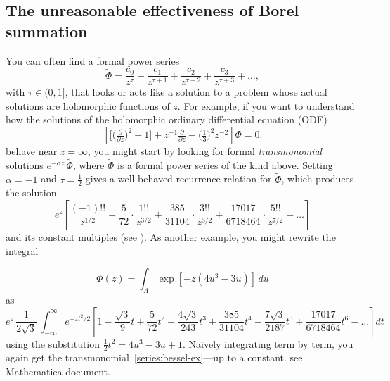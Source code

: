 \documentclass{article}
\newcommand{\series}[1]{\tilde{#1}}
\theoremstyle{definition}
\theoremstyle{plain}
\newenvironment{verify}{\color{ForestGreen}}{\color{black}}
\begin{document}
\subsection{The unreasonable effectiveness of Borel summation}\label{intro:summation}
You can often find a formal power series %
\[ \series{\Phi} = \frac{c_0}{z^\tau} + \frac{c_1}{z^{\tau+1}} + \frac{c_2}{z^{\tau+2}} + \frac{c_3}{z^{\tau+3}} + \ldots, \]
with $\tau \in (0, 1]$, that looks or acts like a solution to a problem whose actual solutions are holomorphic functions of $z$. For example, if you want to understand how the solutions of the holomorphic ordinary differential equation (ODE)
\begin{equation}
\left[ \big[ \big(\tfrac{\partial}{\partial z}\big)^2 - 1 \big] + z^{-1} \tfrac{\partial}{\partial z} - \big(\tfrac{1}{3}\big)^2 z^{-2} \right] \Phi= 0. \label{eqn:bessel-rescaled-1}
\end{equation}
behave near $z = \infty$, you might start by looking for formal {\em transmonomial} solutions $e^{-\alpha z}\,\series{\Phi}$, where $\series{\Phi}$ is a formal power series of the kind above. Setting $\alpha = -1$ and $\tau = \tfrac{1}{2}$ gives a well-behaved recurrence relation for $\series{\Phi}$, which produces the solution 
\begin{equation}
e^{z} \left[ \frac{(-1)!!}{z^{1/2}} + \frac{5}{72} \cdot \frac{1!!}{z^{3/2}} + \frac{385}{31104} \cdot \frac{3!!}{z^{5/2}} + \frac{17017}{6718464} \cdot \frac{5!!}{z^{7/2}} + \ldots \right] \label{series:bessel-ex}
\end{equation}
and its constant multiples (see \cite[equation 10.40.1]{dlmf}). As another example, you might rewrite the integral

\[ \Phi(z) = \int_{\Lambda} \exp\left[-z \left(4 u^3 - 3 u\right)\right]\,du \]
as
\[ e^{z}\, \frac{1}{2\sqrt{3}}\, \int_{-\infty}^\infty e^{-z t^2/2} \left[ 1 - \frac{\sqrt{3}}{9} t + \frac{5}{72} t^2 - \frac{4\sqrt{3}}{243} t^3 + \frac{385}{31104} t^4 - \frac{7\sqrt{3}}{2187} t^5 + \frac{17017}{6718464} t^6 - \ldots \right] dt \]
using the substitution $\tfrac{1}{2} t^2 = 4 u^3 - 3 u + 1$. Na\"{i}vely integrating term by term, you again get the transmonomial~\eqref{series:bessel-ex}---up to a constant.\begin{verify}
    see Mathematica document.
\end{verify}
\end{document}
